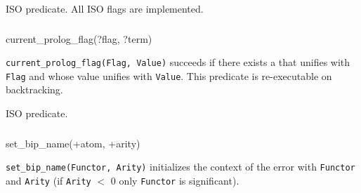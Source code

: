 \Portability

ISO predicate. All ISO flags are implemented.

\subsubsection{\label{current-prolog-flag/2}}

\begin{TemplatesOneCol}
current\_prolog\_flag(?flag, ?term)

\end{TemplatesOneCol}

\Description

\texttt{current\_prolog\_flag(Flag, Value)}
succeeds if there exists a  that unifies with
\texttt{Flag} and whose value unifies with \texttt{Value}. This predicate
is re-executable on backtracking.

\begin{PlErrors}



\end{PlErrors}

\Portability

ISO predicate.

\subsubsection{\label{set-bip-name/2}}

\begin{TemplatesOneCol}
set\_bip\_name(+atom, +arity)

\end{TemplatesOneCol}

\Description

\texttt{set\_bip\_name(Functor, Arity)} initializes the context of the error
 with \texttt{Functor} and
\texttt{Arity} (if \texttt{Arity} $<$ 0 only \texttt{Functor} is
significant).

\begin{PlErrors}





\end{PlErrors}

